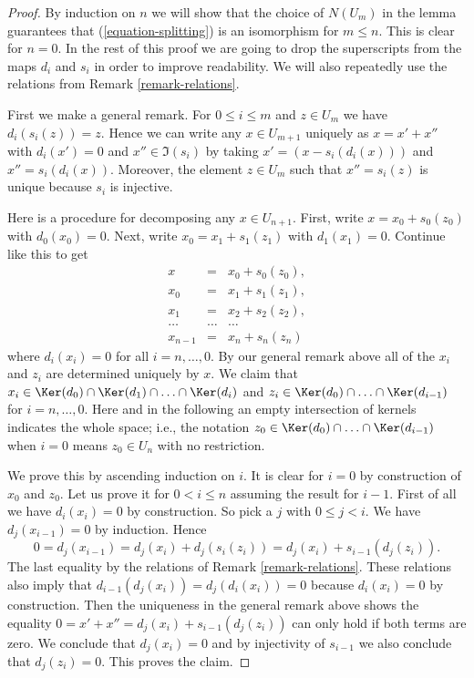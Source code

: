 \begin{proof}
By induction on $n$ we will show that the choice of $N(U_m)$
in the lemma guarantees that (\ref{equation-splitting}) is
an isomorphism for $m \leq n$. This is clear for $n = 0$.
In the rest of this proof we are going to
drop the superscripts from the maps $d_i$ and $s_i$ in order
to improve readability. We will also repeatedly use the relations
from Remark \ref{remark-relations}.

\medskip\noindent
First we make a general remark.
For $0 \leq i \leq m$ and $z \in U_m$ we have
$d_i(s_i(z)) = z$. Hence we can write
any $x \in U_{m + 1}$ uniquely as
$x = x' + x''$ with $d_i(x') = 0$
and $x'' \in \Im(s_i)$
by taking $x' = (x - s_i(d_i(x)))$ and
$x'' = s_i(d_i(x))$. Moreover, the element
$z \in U_m$ such that $x'' = s_i(z)$
is unique because $s_i$ is injective.

\medskip\noindent
Here is a procedure for decomposing any $x \in U_{n + 1}$.
First, write $x = x_0 + s_0(z_0)$ with $d_0(x_0) = 0$.
Next, write $x_0 = x_1 + s_1(z_1)$ with
$d_1(x_1) = 0$. Continue like this to get
\begin{eqnarray*}
x & = & x_0 + s_0(z_0), \\
x_0 & = & x_1 + s_1(z_1), \\
x_1 & = & x_2 + s_2(z_2), \\
\ldots & \ldots & \ldots \\
x_{n - 1} & = & x_n + s_n(z_n)
\end{eqnarray*}
where $d_i(x_i) = 0$ for all $i = n, \ldots, 0$.
By our general remark above all of the $x_i$
and $z_i$ are determined uniquely by $x$.
We claim that
$x_i \in
\Ker(d_0) \cap
\Ker(d_1) \cap
\ldots \cap
\Ker(d_i)$
and
$z_i \in
\Ker(d_0) \cap
\ldots \cap
\Ker(d_{i - 1})$
for $i = n, \ldots, 0$.
Here and in the following
an empty intersection of kernels indicates
the whole space; i.e.,
the notation
$z_0 \in \Ker(d_0) \cap
\ldots \cap
\Ker(d_{i - 1})$
when $i = 0$ means $z_0 \in U_n$ with no restriction.

\medskip\noindent
We prove this by ascending induction on $i$.
It is clear for $i = 0$ by construction of $x_0$ and $z_0$.
Let us prove it for $0 < i \leq n$ assuming the result for $i - 1$.
First of all we have $d_i(x_i) = 0$ by construction.
So pick a $j$ with $0 \leq j < i$. We have
$d_j(x_{i - 1}) = 0$ by induction. Hence
$$
0 = d_j(x_{i - 1})
= d_j(x_i) + d_j(s_i(z_i))
= d_j(x_i) + s_{i - 1}(d_j(z_i)).
$$
The last equality by the relations of Remark \ref{remark-relations}.
These relations also imply that
$d_{i - 1}(d_j(x_i)) = d_j(d_i(x_i)) = 0$
because $d_i(x_i)= 0$ by construction.
Then the uniqueness in the general remark above shows the equality
$0 = x' + x'' = d_j(x_i) + s_{i - 1}(d_j(z_i))$
can only hold if both terms are zero. We conclude that
$d_j(x_i) = 0$ and by injectivity of $s_{i - 1}$ we also
conclude that $d_j(z_i) = 0$. This proves the claim.


\end{proof}
